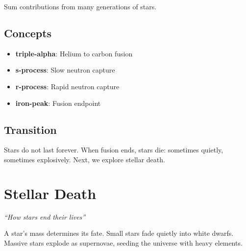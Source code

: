 \documentclass[
  11pt,
  letterpaper,
  twoside,
  openright]{book}
\providecommand{\tightlist}{%
  \setlength{\itemsep}{0pt}\setlength{\parskip}{0pt}}
\begin{document}
Sum contributions from many generations of stars.

\section{Concepts}\label{concepts-21}

\begin{itemize}
\tightlist
\item
  \textbf{triple-alpha}: Helium to carbon fusion
\item
  \textbf{s-process}: Slow neutron capture
\item
  \textbf{r-process}: Rapid neutron capture
\item
  \textbf{iron-peak}: Fusion endpoint
\end{itemize}

\section{Transition}\label{transition-21}

Stars do not last forever. When fusion ends, stars die: sometimes
quietly, sometimes explosively. Next, we explore stellar death.

\chapter{Stellar Death}\label{sec-stellar-death}

\emph{``How stars end their lives''}

\begin{tcolorbox}[enhanced jigsaw, leftrule=.75mm, title=\textcolor{quarto-callout-note-color}{\faInfo}\hspace{0.5em}{Key Revelation}, bottomrule=.15mm, opacityback=0, coltitle=black, arc=.35mm, colframe=quarto-callout-note-color-frame, colbacktitle=quarto-callout-note-color!10!white, colback=white, titlerule=0mm, breakable, bottomtitle=1mm, toptitle=1mm, rightrule=.15mm, toprule=.15mm, left=2mm, opacitybacktitle=0.6]

A star's mass determines its fate. Small stars fade quietly into white
dwarfs. Massive stars explode as supernovae, seeding the universe with
heavy elements.

\end{tcolorbox}
\end{document}
